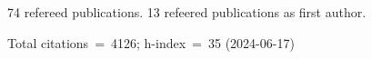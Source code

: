 74 refereed publications. 13 refeered publications as first author.

Total citations~=~4126; h-index~=~35 (2024-06-17)